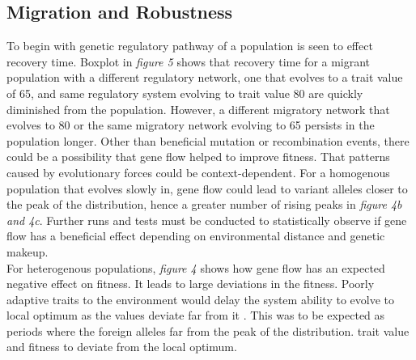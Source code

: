 \subsection{Migration and Robustness}
To begin with genetic regulatory pathway of a population is seen to effect recovery time. Boxplot in \textit{figure 5} shows that recovery time for a migrant population with a different regulatory network, one that evolves to a trait value of 65, and same regulatory system evolving to trait value 80 are quickly diminished from the population. However, a different migratory network that evolves to 80 or the same migratory network evolving to 65 persists in the population longer. Other than beneficial mutation or recombination events, there could be a possibility that gene flow helped to improve fitness. That patterns caused by evolutionary forces could be context-dependent. For a homogenous population that evolves slowly in, gene flow could lead to variant alleles closer to the peak of the distribution, hence a greater number of rising peaks in \textit{figure 4b and 4c}. Further runs and tests must be conducted to statistically observe if gene flow has a beneficial effect depending on environmental distance and genetic makeup.\\
For heterogenous populations, \textit{figure 4} shows how gene flow has an expected negative effect on fitness. It leads to large deviations in the fitness. Poorly adaptive traits to the environment would delay the system ability to evolve to local optimum as the values deviate far from it \cite{garcia1997genetic}. This was to be expected as periods where the foreign alleles far from the peak of the distribution. trait value and fitness to deviate from the local optimum.\\

